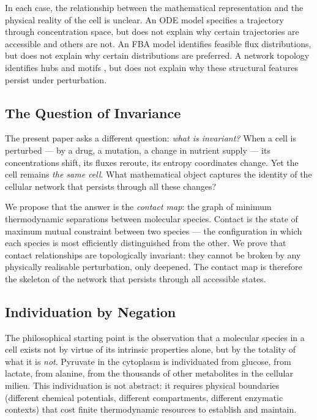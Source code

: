 \documentclass[11pt,twocolumn]{article}
\theoremstyle{plain}
\theoremstyle{definition}
\begin{document}
In each case, the relationship between the mathematical representation and the
physical reality of the cell is unclear. An ODE model specifies a trajectory
through concentration space, but does not explain why certain trajectories are
accessible and others are not. An FBA model identifies feasible flux
distributions, but does not explain why certain distributions are preferred.
A network topology identifies hubs and motifs \cite{alon2007network}, but does
not explain why these structural features persist under perturbation.

\subsection{The Question of Invariance}

The present paper asks a different question: \emph{what is invariant?} When a
cell is perturbed --- by a drug, a mutation, a change in nutrient supply --- its
concentrations shift, its fluxes reroute, its entropy coordinates change. Yet
the cell remains \emph{the same cell}. What mathematical object captures the
identity of the cellular network that persists through all these changes?

We propose that the answer is the \emph{contact map}: the graph of minimum
thermodynamic separations between molecular species. Contact is the state of
maximum mutual constraint between two species --- the configuration in which
each species is most efficiently distinguished from the other. We prove that
contact relationships are topologically invariant: they cannot be broken by any
physically realisable perturbation, only deepened. The contact map is therefore
the skeleton of the network that persists through all accessible states.

\subsection{Individuation by Negation}

The philosophical starting point is the observation that a molecular species in
a cell exists not by virtue of its intrinsic properties alone, but by the
totality of what it is \emph{not}. Pyruvate in the cytoplasm is individuated
from glucose, from lactate, from alanine, from the thousands of other metabolites
in the cellular milieu. This individuation is not abstract: it requires physical
boundaries (different chemical potentials, different compartments, different
enzymatic contexts) that cost finite thermodynamic resources to establish and
maintain.
\end{document}
